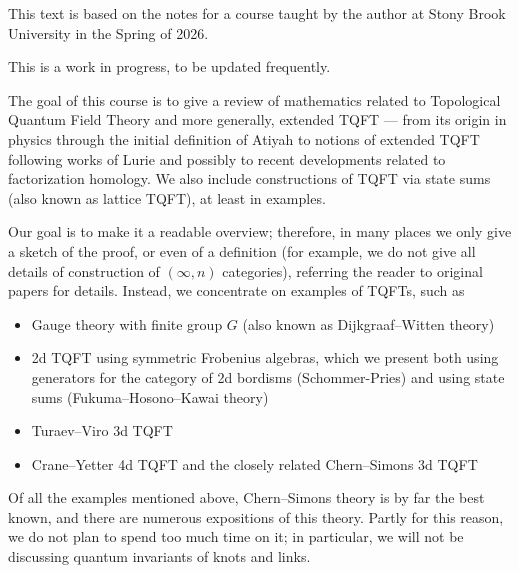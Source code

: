This text is based on the notes for a course taught by the
author at Stony Brook University in the Spring of 2026.

This is a work in progress, to be updated frequently.


The goal of this course is to give a review of mathematics related
to Topological Quantum Field Theory and more generally, extended TQFT ---
from its origin in physics through the initial definition of Atiyah to notions
of extended TQFT following works of Lurie and possibly to recent
developments related to factorization homology. We also
include constructions of TQFT via state sums (also known as lattice
TQFT), at least in examples.

Our goal is to make it a readable overview; therefore, in many places we only
give a sketch of the proof, or even of a definition (for example, we do not give
all details of construction of $(\infty, n)$ categories),  referring the
reader to original papers for details. Instead, we concentrate on examples of
TQFTs, such as
\begin{itemize}
  \item Gauge theory with finite group $G$ (also known as Dijkgraaf--Witten
  theory)
  \item 2d TQFT using symmetric Frobenius algebras, which we present both using
  generators for the category of 2d bordisms (Schommer-Pries)
  and using state sums
  (Fukuma--Hosono--Kawai theory)
  \item Turaev--Viro 3d TQFT
  \item Crane--Yetter 4d TQFT and the closely related Chern--Simons 3d TQFT
\end{itemize}

Of all the examples mentioned above, Chern--Simons theory is by far the best
known, and there are numerous expositions of this theory. Partly for this
reason, we do not plan to spend too much time on it; in particular, we will not
be discussing quantum invariants of knots and links.





